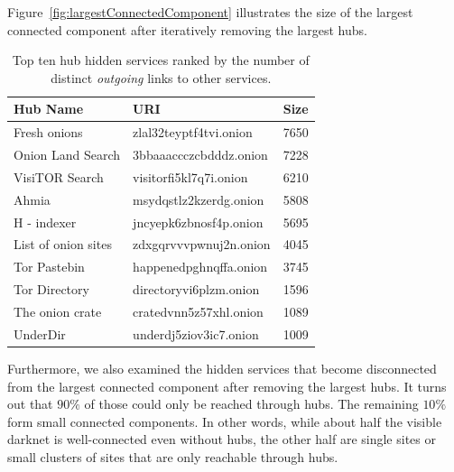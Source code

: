 Figure~\ref{fig:largestConnectedComponent} illustrates the size of the largest connected component after iteratively removing the largest hubs.
\iflncs
  \begin{table}
    \vspace{-20pt}
    \begin{tabular}{l | l | r}
      \hline
      \textbf{Hub Name} & \textbf{URI} & \textbf{Size} \\
      \hline
      \hline
      Fresh onions & zlal32teyptf4tvi.onion  &  7650\\
      \hline
      Onion Land Search & 3bbaaaccczcbdddz.onion  &  7228\\
      \hline
      VisiTOR Search & visitorfi5kl7q7i.onion  &  6210\\
      \hline
      Ahmia & msydqstlz2kzerdg.onion  &  5808\\
      \hline
      H - indexer & jncyepk6zbnosf4p.onion  &  5695\\
      \hline
      List of onion sites & zdxgqrvvvpwnuj2n.onion  &  4045\\
      \hline
      Tor Pastebin & happenedpghnqffa.onion  &  3745\\
      \hline
      Tor Directory & directoryvi6plzm.onion  &  1596\\
      \hline
      The onion crate & cratedvnn5z57xhl.onion  &  1089\\
      \hline
      UnderDir & underdj5ziov3ic7.onion  &  1009\\
      \hline
    \end{tabular}
    \caption{Top ten hub hidden services ranked by the number of distinct \emph{outgoing} links to other services.}\label{table:toptenout}
  \end{table}
\fi
Furthermore, we also examined the hidden services that become disconnected from the largest connected component after removing the largest hubs. It turns out that $90\%$ of those could only be reached through hubs. The remaining $10\%$ form small connected components. In other words, while about half the visible darknet is well-connected even without hubs, the other half are single sites or small clusters of sites that are only reachable through hubs. 
\ifdgruyter
